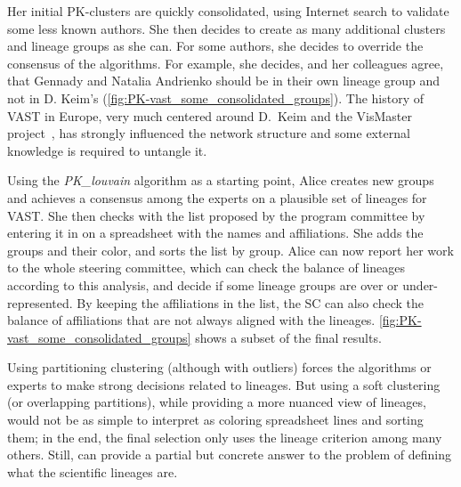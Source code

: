 Her initial PK-clusters are quickly consolidated, using Internet search to validate some less known authors. She then decides to create as many additional clusters and lineage groups as she can.
For some authors, she decides to override the consensus of the algorithms. For example, she decides, and her colleagues agree, that Gennady and Natalia Andrienko should be in their own lineage group and not in D. Keim's (\autoref{fig:PK-vast_some_consolidated_groups}). The history of VAST in Europe, very much centered around D.\ Keim and the VisMaster project~\cite{VisMaster}, has strongly influenced the network structure and some external knowledge is required to untangle it.

Using the \emph{PK\_louvain} algorithm as a starting point, Alice creates new groups and achieves a consensus among the experts on a plausible set of lineages for VAST.
She then checks with the list proposed by the program committee by entering it in on a spreadsheet with the names and affiliations. She adds the groups and their color, and sorts the list by group.
Alice can now report her work to the whole steering committee, which can check the balance of lineages according to this analysis, and decide if some lineage groups are over or under-represented.  By keeping the affiliations in the list, the SC can also check the balance of affiliations that are not always aligned with the lineages.
\autoref{fig:PK-vast_some_consolidated_groups} shows a subset of the final results.


Using partitioning clustering (although with outliers) forces the algorithms or experts to make strong decisions related to lineages. But using a soft clustering (or overlapping partitions), while providing a more nuanced view of lineages, would not be as simple to interpret as coloring spreadsheet lines and sorting them;
in the end, the final selection only uses the lineage criterion among many others. Still, \pkclustering can provide a partial but concrete answer to the problem of defining what the scientific lineages are.


